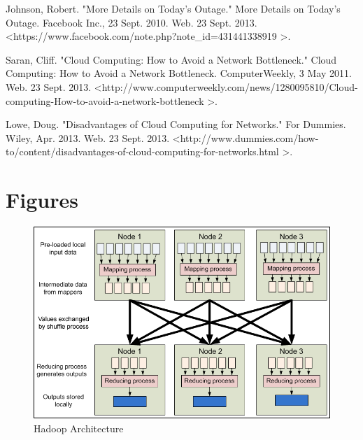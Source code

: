 \documentclass[a4paper]{article}
\begin{document}
\begin{thebibliography}{9}
Johnson, Robert. "More Details on Today's Outage." More Details on Today's Outage. Facebook Inc., 23 Sept. 2010. Web. 23 Sept. 2013.
\textless https://www.facebook.com/note.php?note\_id=431441338919 \textgreater.

Saran, Cliff. "Cloud Computing: How to Avoid a Network Bottleneck." Cloud Computing: How to Avoid a Network Bottleneck. ComputerWeekly, 3 May 2011. Web. 23 Sept. 2013. 
\textless http://www.computerweekly.com/news/1280095810/Cloud-computing-How-to-avoid-a-network-bottleneck \textgreater.

Lowe, Doug. "Disadvantages of Cloud Computing for Networks." For Dummies. Wiley, Apr. 2013. Web. 23 Sept. 2013. \textless http://www.dummies.com/how-to/content/disadvantages-of-cloud-computing-for-networks.html \textgreater.


\end{thebibliography}

\clearpage

\appendix
\section{Figures}

\begin{figure}[!htbp]
\centering
\includegraphics[width=1.0\textwidth]{images/HadoopArchitecture.png}
\caption{Hadoop Architecture}
\label{fig:HadoopArchitecture}
\end{figure}
\end{document}
